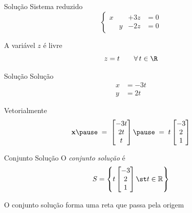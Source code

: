 \begin{resolution}{Solução}
  Sistema reduzido
  \[
    \left\{\begin{array}{rrrr}
      x &   & + 3z & = 0 \\
        & y & - 2z & = 0
    \end{array}\right.
  \]

  \pause
  \bigskip
  A variável $z$ é livre
  \[
    z = t
    \qquad
    \forall\, t \in \R
  \]
\end{resolution}

\begin{resolution}{Solução}
  Solução
  \begin{align*}
    x & = -3t \\
    y & =  2t
  \end{align*}

  \pause
  Vetorialmente
  \[
    \mathbf{x}
    \pause
    \;=\;
    \begin{bmatrix}
      -3t \\
      2t  \\
      t
    \end{bmatrix}
    \pause
    \;=\;
    t
    \begin{bmatrix}
      -3 \\
      2  \\
      1
    \end{bmatrix}
  \]
\end{resolution}

\begin{resolution}{Conjunto Solução}
  O \emph{conjunto solução} é
  \[
    S
    =
    \left\{
    t
    \begin{bmatrix}
      -3 \\
      2  \\
      1
    \end{bmatrix}
    \st
    t\in\mathbb{R}
    \right\}
  \]

  \pause
  O conjunto solução forma uma reta que passa pela origem
\end{resolution}

\endinput
